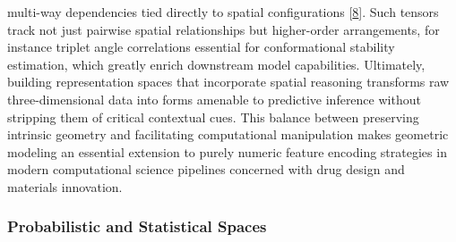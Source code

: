 \documentclass[
]{article}
\begin{document}
multi-way dependencies tied directly to spatial configurations
{[}\protect\hyperlink{_bookmark48}{8}{]}. Such tensors track not just
pairwise spatial relationships but higher-order arrangements, for
instance triplet angle correlations essential for conformational
stability estimation, which greatly enrich downstream model
capabilities. Ultimately, building representation spaces that
incorporate spatial reasoning transforms raw three-dimensional data into
forms amenable to predictive inference without stripping them of
critical contextual cues. This balance between preserving intrinsic
geometry and facilitating computational manipulation makes geometric
modeling an essential extension to purely numeric feature encoding
strategies in modern computational science pipelines concerned with drug
design and materials innovation.

\hypertarget{probabilistic-and-statistical-spaces}{%
\subsubsection{Probabilistic and Statistical
Spaces}\label{probabilistic-and-statistical-spaces}}
\end{document}
